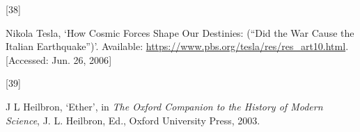 \documentclass[
  a4paper,
]{article}
\newlength{\cslhangindent}
\newlength{\csllabelwidth}
\newlength{\cslentryspacingunit} %
\newenvironment{CSLReferences}[2] %
 {%
  \setlength{\parindent}{0pt}
  \ifodd #1
  \let\oldpar\par
  \def\par{\hangindent=\cslhangindent\oldpar}
  \fi
  \setlength{\parskip}{#2\cslentryspacingunit}
 }%
 {}
\newcommand{\CSLLeftMargin}[1]{\parbox[t]{\csllabelwidth}{#1}}
\newcommand{\CSLRightInline}[1]{\parbox[t]{\linewidth - \csllabelwidth}{#1}\break}
\begin{document}
\begin{CSLReferences}{0}{0}
\leavevmode{}%
\CSLLeftMargin{{[}38{]} }%
\CSLRightInline{Nikola Tesla, {`{How Cosmic Forces Shape Our Destinies:
({``Did the War Cause the Italian Earthquake''})}'}. Available:
\url{https://www.pbs.org/tesla/res/res_art10.html}. {[}Accessed: Jun.
26, 2006{]}}

\leavevmode{}%
\CSLLeftMargin{{[}39{]} }%
\CSLRightInline{J L Heilbron, {`Ether'}, in \emph{{The Oxford Companion
to the History of Modern Science}}, J. L. Heilbron, Ed., Oxford
University Press, 2003.}

\end{CSLReferences}
\end{document}
